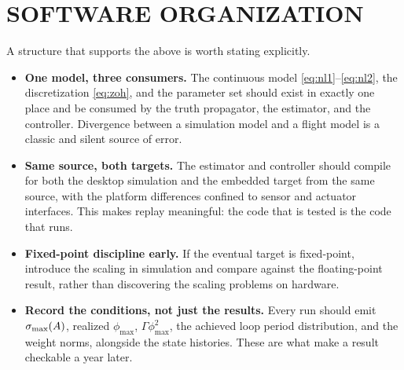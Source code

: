 \section{SOFTWARE ORGANIZATION}

A structure that supports the above is worth stating explicitly.

\begin{itemize}[leftmargin=*]
\item \textbf{One model, three consumers.} The continuous model
\eqref{eq:nl1}--\eqref{eq:nl2}, the discretization \eqref{eq:zoh}, and the
parameter set should exist in exactly one place and be consumed by the truth
propagator, the estimator, and the controller. Divergence between a simulation
model and a flight model is a classic and silent source of error.
\item \textbf{Same source, both targets.} The estimator and controller should
compile for both the desktop simulation and the embedded target from the same
source, with the platform differences confined to sensor and actuator
interfaces. This makes replay meaningful: the code that is tested is the code
that runs.
\item \textbf{Fixed-point discipline early.} If the eventual target is
fixed-point, introduce the scaling in simulation and compare against the
floating-point result, rather than discovering the scaling problems on
hardware.
\item \textbf{Record the conditions, not just the results.} Every run should
emit $\sigma_{\max}(A)$, realized $\phi_{\max}$, $\Gamma\phi_{\max}^2$, the achieved
loop period distribution, and the weight norms, alongside the state histories.
These are what make a result checkable a year later.
\end{itemize}
